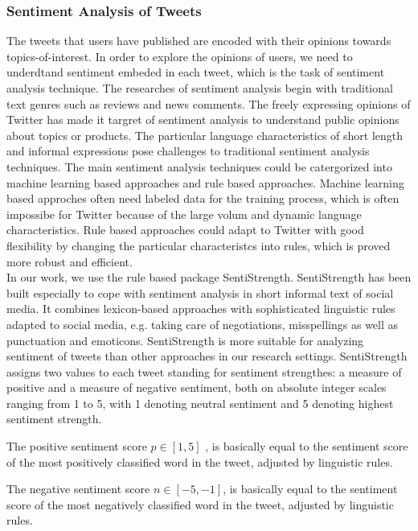 \documentclass{acm_proc_article-sp}
\begin{document}
\subsubsection{Sentiment Analysis of Tweets}
The tweets that users have published are encoded with their opinions towards topics-of-interest. 
In order to explore the opinions of users, we need to underdtand sentiment embeded in each tweet, which is the task of sentiment analysis technique.
The researches of sentiment analysis begin with traditional text genres such as reviews and news comments. 
The freely expressing opinions of Twitter has made it targret of sentiment analysis to understand public opinions about topics or products.
The particular language characteristics of short length and informal expressions pose challenges to traditional sentiment analysis techniques.
The main sentiment analysis techniques could be catergorized into machine learning based approaches and rule based approaches.
Machine learning based approches often need labeled data for the training process, which is often impossibe for Twitter because of the large volum and dynamic language characteristics. 
Rule based approaches could adapt to Twitter with good flexibility by changing the particular characteristcs into rules, which is proved more robust and efficient.\\
In our work, we use the rule based package SentiStrength\cite{Thelwall:2010SSS}. 
SentiStrength has been built especially to cope with sentiment analysis in short informal text of social media. 
It combines lexicon-based approaches with sophisticated linguistic rules adapted to social media, e.g. taking care of negotiations, misspellings as well as punctuation and emoticons. 
SentiStrength is more suitable for analyzing sentiment of tweets than other approaches in our research settings.
SentiStrength assigns two values to each tweet standing for sentiment strengthes: a measure of positive and a measure of negative sentiment, both on absolute integer scales ranging from 1 to 5, with 1 denoting neutral sentiment and 5 denoting highest sentiment strength.
\begin{itemize*}
\item The positive sentiment score $ p \in \left[ 1, 5 \right]  $ , is basically equal to the sentiment score of the most positively classified word in the tweet, adjusted by linguistic rules.
\item The negative sentiment score $ n \in \left[ -5, -1 \right] $, is basically equal to the sentiment score of the most negatively classified word in the tweet, adjusted by linguistic rules.
\end{itemize*}
\end{document}
